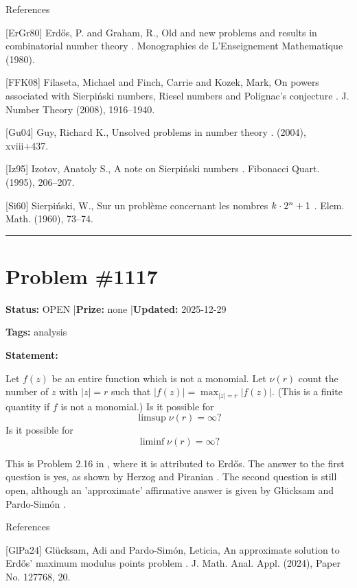 \documentclass{article}
\begin{document}
References

[ErGr80] Erd\H{o}s, P. and Graham, R., Old and new problems and results in combinatorial number theory . Monographies de L'Enseignement Mathematique (1980).

[FFK08] Filaseta, Michael and Finch, Carrie and Kozek, Mark, On powers associated with Sierpi\'nski numbers, {R}iesel numbers and {P}olignac's conjecture . J. Number Theory (2008), 1916--1940.

[Gu04] Guy, Richard K., Unsolved problems in number theory . (2004), xviii+437.

[Iz95] Izotov, Anatoly S., A note on Sierpi\'nski numbers . Fibonacci Quart. (1995), 206--207.

[Si60] Sierpi\'nski, W., Sur un probl\`eme concernant les nombres {$k\cdot 2\sp{n}+1$} . Elem. Math. (1960), 73--74.

\noindent\rule{\linewidth}{0.4pt}


\section{Problem \#1117}
\label{prob:1117}

\noindent\textbf{Status:} OPEN \quad|\quad \textbf{Prize:} none \quad|\quad \textbf{Updated:} 2025-12-29

\noindent\textbf{Tags:} analysis

\medskip

\noindent\textbf{Statement:}

Let $f(z)$ be an entire function which is not a monomial. Let $\nu(r)$ count the number of $z$ with $\lvert z\rvert=r$ such that $\lvert f(z)\rvert=\max_{\lvert z\rvert=r}\lvert f(z)\rvert$. (This is a finite quantity if $f$ is not a monomial.) Is it possible for\[\limsup \nu(r)=\infty?\]Is it possible for\[\liminf \nu(r)=\infty?\]




This is Problem 2.16 in \cite{Ha74}, where it is attributed to Erd\H{o}s. The answer to the first question is yes, as shown by Herzog and Piranian \cite{HePi68}. The second question is still open, although an 'approximate' affirmative answer is given by Gl\"{u}cksam and Pardo-Sim\'{o}n \cite{GlPa24}.




References

[GlPa24] Gl\"ucksam, Adi and Pardo-Sim\'on, Leticia, An approximate solution to {E}rd\H{o}s' maximum modulus points problem . J. Math. Anal. Appl. (2024), Paper No. 127768, 20.
\end{document}
